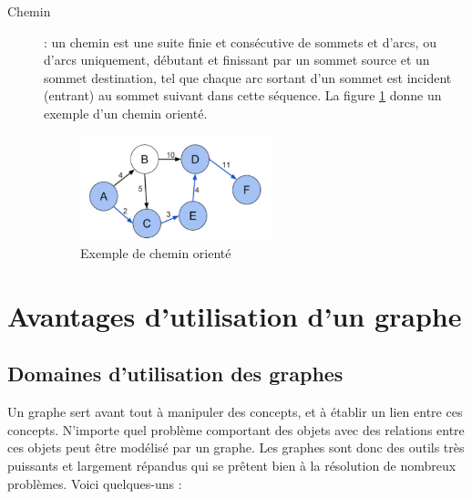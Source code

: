 \begin{description}
\item[Chemin] : un chemin est une suite finie et consécutive de sommets et d'arcs, ou d'arcs uniquement, débutant et finissant par un sommet source et un sommet destination, tel que chaque arc sortant d'un sommet est incident (entrant) au sommet suivant dans cette séquence.
La figure \ref{fig:chemin} donne un exemple d'un chemin orienté.
\begin{figure}[h]
	\centering
	\includegraphics[width=0.55\textwidth]{img/cheminGraphe.png}
	\caption{Exemple de chemin orienté}
	\label{fig:chemin}
\end{figure}
\end{description}

	
	
\section{Avantages d'utilisation d'un graphe}
\subsection{Domaines d'utilisation des graphes}
Un graphe sert avant tout à manipuler des concepts, et à établir un lien entre ces concepts. N'importe quel problème comportant des objets avec des relations entre ces objets peut être modélisé par un graphe.
Les graphes sont donc des outils très puissants et largement répandus qui se prêtent bien à la résolution de nombreux problèmes. Voici quelques-uns \cite{domainesGraphe}:

